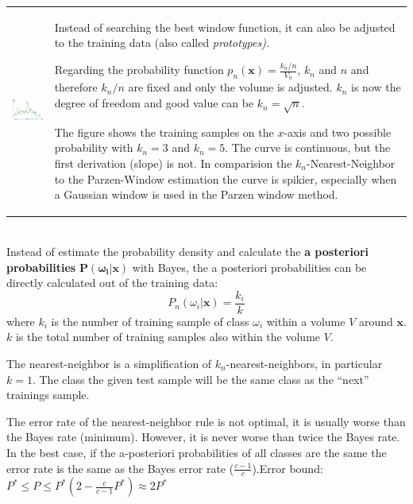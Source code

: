   
    \begin{tabular}{ll}
      \parbox{7cm}{
        \includegraphics[width=6cm]{./images/k-nearest-neighbor.jpg}
          }
        & \parbox{11cm}{
          Instead of searching the best window function, it can also be adjusted to the training data 
          (also called \em prototypes\em).
          
          Regarding the probability function $p_n(\bm{x}) = \frac{k_n/n}{V_n}$, $k_n$ and $n$
          and therefore $k_n/n$ are fixed and only the volume is adjusted. $k_n$ is now the degree 
          of freedom and good value can be $k_n = \sqrt{n}$.
          
          The figure shows the training samples on the $x$-axis and two possible probability
          with $k_n=3$ and $k_n=5$. The curve is continuous, but the first derivation (slope) is not. 
          In comparision the $k_n$-Nearest-Neighbor to the Parzen-Window estimation the curve is spikier, especially when a Gaussian window is used 
          in the Parzen window method.
          }
    \end{tabular} 
    \vspace{3mm}\\
    Instead of estimate the probability density and calculate the \textbf{a posteriori probabilities} $\bm {P(\omega_i | \bm x)}$ with Bayes, the a posteriori 
    probabilities can be directly calculated out of the training data:\\
    $$ P_n(\omega_i|\bm x)=\frac{k_i}{k}$$
    where $k_i$ is the number of training sample of class $\omega_i$ within a volume $V$ around $\bm x$.
    $k$ is the total number of training samples also within the volume $V$.
  
  
  	The nearest-neighbor is a simplification of $k_n$-nearest-neighbors, in particular $k=1$. 
  	The class the given test sample will be the same class as the ``next'' trainings sample.
  	
    The error rate of the nearest-neighbor rule is not optimal, it is usually worse than the Bayes 
    rate (minimum). However, it is never worse than twice the Bayes rate. 
    In the best case, if the a-posteriori probabilities of all classes are the same
    the error rate is the same as the Bayes error rate ($\frac{c-1}{c}$).\qquad Error bound: $P^*\leq P\leq P^*\left(2-\frac{c}{c-1}P^*\right)\approx 2P^*$ \\

